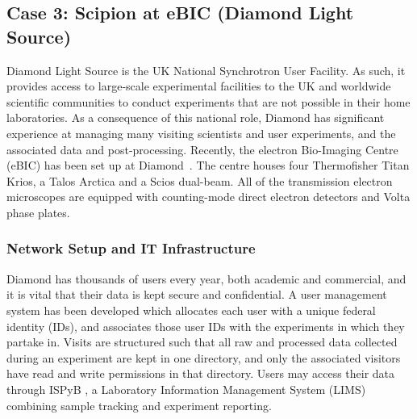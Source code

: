 
\subsection{Case 3: Scipion at eBIC (Diamond Light Source)}

Diamond Light Source is the UK National Synchrotron User Facility.  As such, it provides access to large-scale experimental facilities to the UK and worldwide scientific communities to conduct experiments that are not possible in their home laboratories.  As a consequence of this national role, Diamond has significant experience at managing many visiting scientists and user experiments, and the associated data and post-processing.  %
Recently, the electron Bio-Imaging Centre (eBIC) has been set up at Diamond~\citep{diamond2017}. The centre houses four Thermofisher Titan Krios, a Talos Arctica and a Scios dual-beam. All of the transmission electron microscopes are equipped with counting-mode direct electron detectors and Volta phase plates. 

\subsubsection{Network Setup and IT Infrastructure}

Diamond has thousands of users every year, both academic and commercial, and it is vital that their data is kept secure and confidential. A user management system has been developed which allocates each user with a unique federal identity (IDs), and associates those user IDs with the experiments in which they partake in. Visits are structured such that all raw and processed data collected during an experiment are kept in one directory, and only the associated visitors have read and write permissions in that directory. Users may access their data through ISPyB \citep{Delageniere2011:ispb},  a Laboratory Information Management System (LIMS) combining sample tracking and experiment reporting. %

